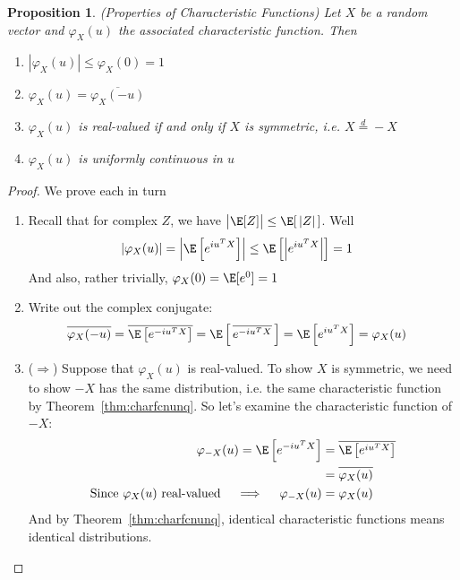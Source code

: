 \documentclass[12pt]{article}
\theoremstyle{plain}
\newtheorem{prop}[thm]{Proposition}
\theoremstyle{definition}
\theoremstyle{remark}
\begin{document}
\begin{prop}\emph{(Properties of Characteristic Functions)}
Let $X$ be a random vector and $\varphi_X(u)$ the associated
characteristic function. Then
\begin{enumerate}[label=\emph{(\roman*)}]
  \item $|\varphi_X(u)| \leq \varphi_X(0) = 1$
  \item $\varphi_X(u) = \overline{\varphi_X(-u)}$
  \item $\varphi_X(u)$ is real-valued if and only if $X$ is symmetric,
    i.e. $X \overset{d}{=} -X$
  \item $\varphi_X(u)$ is uniformly continuous in $u$
\end{enumerate}
\end{prop}
\begin{proof}
We prove each in turn
\begin{enumerate}[label=(\roman*)]
  \item Recall that for complex $Z$, we have
    $\big|\E[Z]\big|\leq \E[\,|Z|\,]$. Well
    \begin{align*}
      |\varphi_X(u)|
      =
      \left\lvert\E\left[e^{iu^TX}\right]\right\rvert
      &\leq
      \E\left[\left\lvert e^{iu^TX}\right\rvert\right]
      = 1
    \end{align*}
    And also, rather trivially, $\varphi_X(0)=\E[e^{0}] = 1$

  \item Write out the complex conjugate:
    \begin{align*}
      \overline{\varphi_X(-u)}
      &=
      \overline{\E\left[e^{-iu^TX}\right]}
      =
      \E\left[\,\overline{e^{-iu^TX}}\,\right]
      =
      \E\left[e^{iu^TX}\right]
      =
      \varphi_X(u)
    \end{align*}

  \item
    ($\Rightarrow$)
    Suppose that $\varphi_X(u)$ is real-valued. To show $X$ is
    symmetric, we need to show $-X$ has the same distribution, i.e. the
    same characteristic function by Theorem~\ref{thm:charfcnunq}. So
    let's examine the characteristic function of $-X$:
    \begin{align*}
      \varphi_{-X}(u)
      =
      \E\left[e^{-iu^TX}\right]
      &=
      \overline{\E\left[e^{iu^TX}\right]} \\
      &=
      \overline{\varphi_X(u)} \\
      \text{Since $\varphi_X(u)$ real-valued}
      \quad\implies\quad
      \varphi_{-X}(u)
      &= \varphi_X(u)
    \end{align*}
    And by Theorem~\ref{thm:charfcnunq}, identical characteristic
    functions means identical distributions.


\end{enumerate}
\end{proof}
\end{document}
